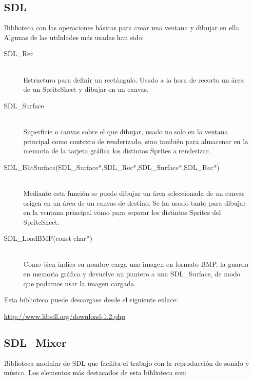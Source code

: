 \documentclass[parskip=half*]{scrartcl}
\begin{document}
	\subsection{SDL}
	Biblioteca con las operaciones b\'asicas para crear una ventana y dibujar en ella. Algunas de las utilidades m\'as usadas han sido:
	\begin{description}
		\item[SDL\_Rec] \hfill \\		Estructura para definir un rect\'angulo. Usado a la hora de recorta un \'area de un SpriteSheet y dibujar en un canvas.
		
		\item[SDL\_Surface] \hfill \\	Superficie o canvas sobre el que dibujar, usado no solo en la ventana principal como contexto de renderizado, sino tambi\'en para almacenar en la memoria de la tarjeta gr\'afica los distintos Sprites a renderizar.
		
		\item[SDL\_BlitSurface(SDL\_Surface*,SDL\_Rec*,SDL\_Surface*,SDL\_Rec*)] \hfill \\ Mediante esta funci\'on se puede dibujar un \'area seleccionada de un canvas origen en un \'area de un canvas de destino. Se ha usado tanto para dibujar en la ventana principal como para separar los distintos Sprites del SpriteSheet.

		\item[SDL\_LoadBMP(const char*)] \hfill \\	Como bien indica su nombre carga una imagen en formato BMP, la guarda en memoria gr\'afica y devuelve un puntero a una SDL\_Surface, de modo que podamos usar la imagen cargada.
	\end{description}

	Esta biblioteca puede descargase desde el siguiente enlace: \\

	\centerline{\url{http://www.libsdl.org/download-1.2.php}}
	\subsection{SDL\_Mixer}
	Biblioteca modular de SDL que facilita el trabajo con la reproducci\'on de sonido y m\'usica. Los elementos m\'as destacados de esta biblioteca son:
\end{document}
